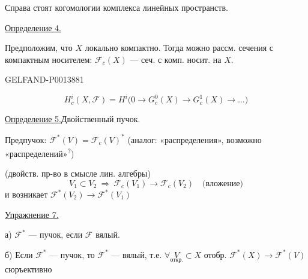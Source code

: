 Справа стоят когомологии комплекса линейных пространств.

\uline{Определение 4.}

Предположим, что \(X\) локально компактно. Тогда можно рассм. сечения с компактным носителем:
\(\mathcal F_c(X)\) --- сеч. с комп. носит. на \(X\).


\begin{GelfandAdjacentEvidence}{GELFAND-P001388}{1}

\[
H_c^i(X,\mathcal F)=H^i\bigl(0\longrightarrow G_c^0(X)\longrightarrow
G_c^1(X)\longrightarrow\ldots\bigr)
\]

\uline{Определение 5.}\quad Двойственный пучок.

Предпучок: \(\mathcal F^*(V)=\mathcal F_c(V)^*\)
(аналог: «распределения», возможно «распределений»\textsuperscript{?})
\end{GelfandAdjacentEvidence}


(двойств. пр-во в смысле лин. алгебры)
\[
V_1\subset V_2\ \Rightarrow\ \mathcal F_c(V_1)\longrightarrow\mathcal F_c(V_2)
\quad\text{(вложение)}
\]
и возникает \(\mathcal F^*(V_2)\longrightarrow\mathcal F^*(V_1)\)

\uline{Упражнение 7.}

а) \(\mathcal F^*\) --- пучок, если \(\mathcal F\) вялый.

б) Если \(\mathcal F^*\) --- пучок, то \(\mathcal F^*\)
--- вялый, т.е. \(\forall\underset{\text{откр.}}{V}\subset X\)
отобр. \(\mathcal F^*(X)\longrightarrow\mathcal F^*(V)\) сюръективно


